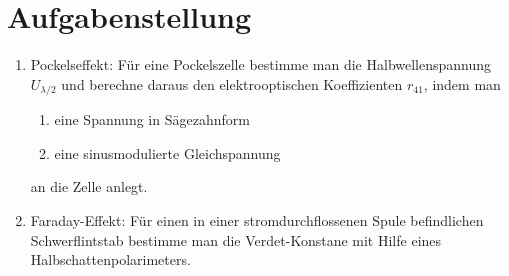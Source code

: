 \section{Aufgabenstellung}

\begin{enumerate}

\item Pockelseffekt: Für eine Pockelszelle bestimme man die Halbwellenspannung $U_{\lambda/2}$ und berechne daraus den elektrooptischen Koeffizienten $r_{41}$, indem man
\begin{enumerate}
	\item eine Spannung in Sägezahnform
	\item eine sinusmodulierte Gleichspannung
\end{enumerate}
an die Zelle anlegt.

\item  Faraday-Effekt: Für einen in einer stromdurchflossenen Spule befindlichen Schwerflintstab bestimme man die Verdet-Konstane mit Hilfe eines Halbschattenpolarimeters.

\end{enumerate}